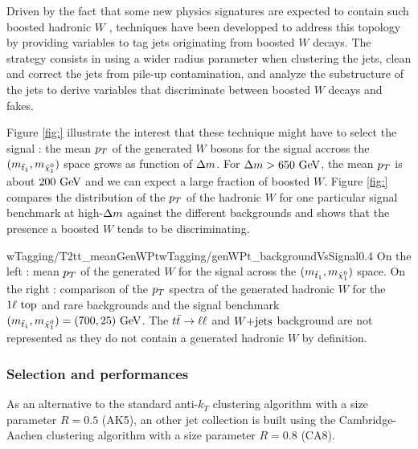              Driven by the fact that some new physics signatures are expected to contain
             such boosted hadronic $W$ , techniques have been developped to
             address this topology by providing variables to tag jets originating from
             boosted $W$ decays. The strategy consists in using a wider radius parameter
             when clustering the jets, clean and correct the jets from pile-up contamination, 
             and analyze the substructure of the jets to derive variables that discriminate 
             between boosted $W$ decays and fakes.

             Figure \ref{fig:} illustrate the interest that these technique might have to
             select the signal : the mean $p_T$ of the generated 
             $W$ bosons for the signal accross the $(m_{\tilde{t}_1}, m_{\tilde{\chi}_1^0})$
             space grows as function of $\Delta m$. For $\Delta m > 650~\text{GeV}$, the 
             mean $p_T$ is about $200~\text{GeV}$ and we can expect a large fraction of boosted $W$. 
             Figure \ref{fig:} compares the distribution of the $p_T$ of the hadronic $W$ for one 
             particular signal benchmark at high-$\Delta m$ against the different backgrounds
             and shows that the presence a boosted $W$ tends to be discriminating.
             
                              {wTagging/T2tt_meanGenWPt}{wTagging/genWPt_backgroundVsSignal}{0.4}
                              {On the left : mean $p_T$ of the generated $W$ for the
                              signal across the $(m_{\tilde{t}_1}, m_{\tilde{\chi}_1^0})$ space.
                              On the right : comparison of the $p_T$ spectra of the generated
                              hadronic $W$ for the $1\ell~\text{top}$ and rare backgrounds and
                              the signal benchmark $(m_{\tilde{t}_1}, m_{\tilde{\chi}_1^0}) = (700,25) ~\text{GeV}$.
                              The $t\bar{t} \rightarrow \ell \ell$ and $\text{$W$+jets}$ background are not represented
                              as they do not contain a generated hadronic $W$ by definition.}

            \subsubsection{Selection and performances}

            As an alternative to the standard anti-$k_T$ clustering algorithm with a 
            size parameter $R = 0.5$ (AK5), an other jet collection is built using the 
            Cambridge-Aachen clustering algorithm with a size parameter $R = 0.8$ (CA8).

